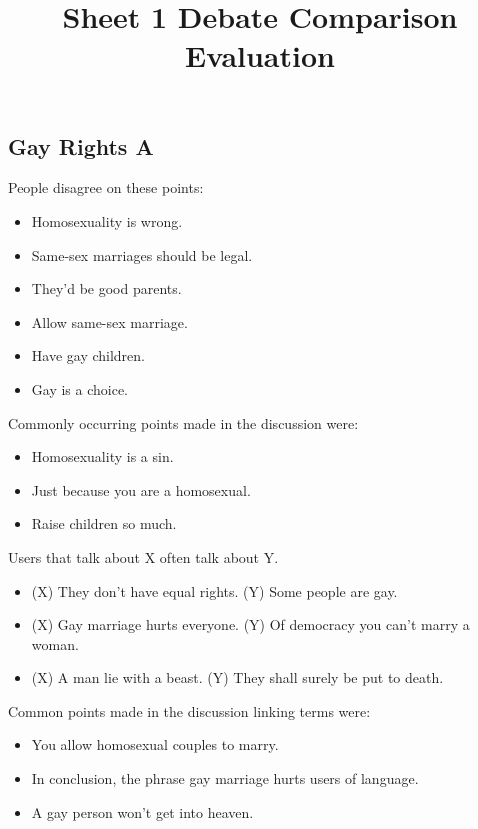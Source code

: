 \documentclass[tikz]{article}
\title{\textbf{Sheet 1} Debate Comparison Evaluation\vspace{-9ex}}
\date{}
\begin{document}
  \maketitle

  \begin{multicols}{2}
    \subsection*{Gay Rights A}
    People disagree on these points:
    \begin{itemize}[noitemsep,nolistsep,label={}]
      \item{Homosexuality is wrong.}
      \item{Same-sex marriages should be legal.}
      \item{They'd be good parents.}
      \item{Allow same-sex marriage.}
      \item{Have gay children.}
      \item{Gay is a choice.}
    \end{itemize}

    Commonly occurring points made in the discussion were:
    \begin{itemize}[noitemsep,nolistsep,label={}]
      \item{Homosexuality is a sin.}
      \item{Just because you are a homosexual.}
      \item{Raise children so much.}
    \end{itemize}

    Users that talk about X often talk about Y.
    \begin{itemize}[noitemsep,nolistsep,label={}]
      \item{(X) They don't have equal rights. (Y) Some people are gay.}
      \item{(X) Gay marriage hurts everyone. (Y) Of democracy you can't marry a woman.}
      \item{(X) A man lie with a beast. (Y) They shall surely be put to death.}
    \end{itemize}

    Common points made in the discussion linking terms were:
    \begin{itemize}[noitemsep,nolistsep,label={}]
      \item{You allow homosexual couples to marry.}
      \item{In conclusion, the phrase gay marriage hurts users of language.}
      \item{A gay person won't get into heaven.}
    \end{itemize}


\end{multicols}
\end{document}
